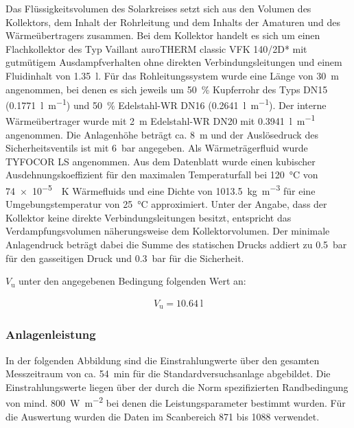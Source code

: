 Das Flüssigkeitsvolumen des Solarkreises setzt sich aus den Volumen des Kollektors, dem Inhalt der Rohrleitung und dem Inhalts der Amaturen und des Wärmeübertragers zusammen. Bei dem Kollektor handelt es sich um einen Flachkollektor des Typ Vaillant auroTHERM classic VFK 140/2D* mit gutmütigem Ausdampfverhalten ohne direkten Verbindungsleitungen und einem Fluidinhalt von \SI{1,35}{\litre}. Für das Rohleitungssystem wurde eine Länge von \SI{30}{\metre} angenommen, bei denen es sich jeweils um \SI{50}{\percent} Kupferrohr des Typs DN15 (\SI{0,1771}{\litre\per\metre}) und \SI{50}{\percent} Edelstahl-WR DN16 (\SI{0,2641}{\litre\per\metre}). Der interne Wärmeübertrager wurde mit \SI{2}{\metre} Edelstahl-WR DN20 mit \SI{0,3941}{\litre\per\metre} angenommen. Die Anlagenhöhe beträgt ca. \SI{8}{\metre} und der Auslösedruck des Sicherheitsventils ist mit \SI{6}{\bar} angegeben. Als Wärmeträgerfluid wurde TYFOCOR LS angenommen. Aus dem Datenblatt wurde einen kubischer Ausdehnungskoeffizient für den maximalen Temperaturfall bei \SI{120}{\celsius} von \SI{74e-5}{\per\kelvin} Wärmefluids und eine Dichte von \SI{1013,5}{\kg\per\metre\cubed} für eine Umgebungstemperatur von \SI{25}{\celsius} approximiert. Unter der Angabe, dass der Kollektor keine direkte Verbindungsleitungen besitzt, entspricht das Verdampfungsvolumen näherungsweise dem Kollektorvolumen. Der minimale Anlagendruck beträgt dabei die Summe des statischen Drucks addiert zu \SI{0,5}{\bar} für den gasseitigen Druck und \SI{0,3}{\bar} für die Sicherheit. 

$V_{\text{u}}$ unter den angegebenen Bedingung folgenden Wert an:

\begin{equation*}
	\label{MAG-Ber.}
	\begin{aligned}
	V_{\text{u}}=  \SI{10,64}{\litre}
	\end{aligned}
\end{equation*}

\subsubsection{Anlagenleistung}

In der folgenden Abbildung sind die Einstrahlungwerte über den gesamten Messzeitraum von ca. \SI{54}{\minute} für die Standardversuchsanlage abgebildet. 
Die Einstrahlungswerte liegen über der durch die Norm spezifizierten Randbedingung von mind. \SI{800}{\watt\per\meter\squared} bei denen die Leistungsparameter bestimmt wurden. Für die Auswertung wurden die Daten im Scanbereich 871 bis 1088 verwendet.

